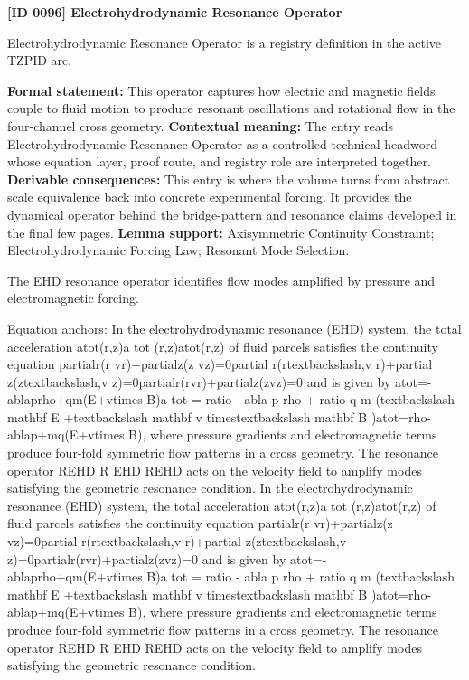 \clearpage
\noindent\textbf{[ID 0096] Electrohydrodynamic Resonance Operator}\par
\vspace{0.35em}
\begingroup\small
{}
Electrohydrodynamic Resonance Operator is a registry definition in the active TZPID arc.

\begingroup\footnotesize\setlength{\emergencystretch}{3em}\sloppy
\textbf{Formal statement:} This operator captures how electric and magnetic fields couple to fluid motion to produce resonant oscillations and rotational flow in the four-channel cross geometry. \textbf{Contextual meaning:} The entry reads Electrohydrodynamic Resonance Operator as a controlled technical headword whose equation layer, proof route, and registry role are interpreted together. \textbf{Derivable consequences:} This entry is where the volume turns from abstract scale equivalence back into concrete experimental forcing. It provides the dynamical operator behind the bridge-pattern and resonance claims developed in the final few pages. \textbf{Lemma support:} Axisymmetric Continuity Constraint; Electrohydrodynamic Forcing Law; Resonant Mode Selection.\par
\endgroup

The EHD resonance operator identifies flow modes amplified by pressure and electromagnetic forcing.

Equation anchors: In the electrohydrodynamic resonance (EHD) system, the total acceleration atot(r,z)a tot (r,z)atot(r,z) of fluid parcels satisfies the continuity equation partialr(r vr)+partialz(z vz)=0partial r(rtextbackslash,v r)+partial z(ztextbackslash,v z)=0partialr(rvr)+partialz(zvz)=0 and is given by atot=- ablaprho+qm(E+vtimes B)a tot = ratio - abla p rho + ratio q m (textbackslash mathbf E +textbackslash mathbf v timestextbackslash mathbf B )atot=rho- ablap+mq(E+vtimes B), where pressure gradients and electromagnetic terms produce four-fold symmetric flow patterns in a cross geometry. The resonance operator REHD R EHD REHD acts on the velocity field to amplify modes satisfying the geometric resonance condition. In the electrohydrodynamic resonance (EHD) system, the total acceleration atot(r,z)a tot (r,z)atot(r,z) of fluid parcels satisfies the continuity equation partialr(r vr)+partialz(z vz)=0partial r(rtextbackslash,v r)+partial z(ztextbackslash,v z)=0partialr(rvr)+partialz(zvz)=0 and is given by atot=- ablaprho+qm(E+vtimes B)a tot = ratio - abla p rho + ratio q m (textbackslash mathbf E +textbackslash mathbf v timestextbackslash mathbf B )atot=rho- ablap+mq(E+vtimes B), where pressure gradients and electromagnetic terms produce four-fold symmetric flow patterns in a cross geometry. The resonance operator REHD R EHD REHD acts on the velocity field to amplify modes satisfying the geometric resonance condition.

